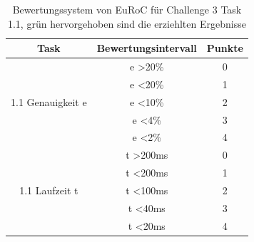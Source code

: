 \documentclass[12pt,titlepage, a4paper]{article}
\begin{document}
\begin{table}
\centering
\begin{tabular}{c|c|c}
Task & Bewertungsintervall & Punkte\\
\hline
\multirow{5}{*}{1.1 Genauigkeit e} & e \textgreater 20\% & 0 \\
 & e \textless 20\% & 1\\  
  & e \textless 10\% & 2\\
   & e \textless 4\% & 3\\
 &\cellcolor{green!10.0} e \textless 2\% & \cellcolor{green!10.0}4\\
\hline
\multirow{5}{*}{1.1 Laufzeit t} & t \textgreater 200ms & 0 \\
 & t \textless 200ms & 1\\  
  & t \textless 100ms & 2\\
  & \cellcolor{green!10.0}t \textless 40ms &\cellcolor{green!10.0} 3\\
 & t \textless 20ms & 4\\
\hline
\end{tabular}\\
\vspace{10mm}
\caption{Bewertungssystem von EuRoC für Challenge 3 Task 1.1, grün hervorgehoben sind die erziehlten Ergebnisse}
\label{table:scoringt1}
\end{table}
				
\end{document}
